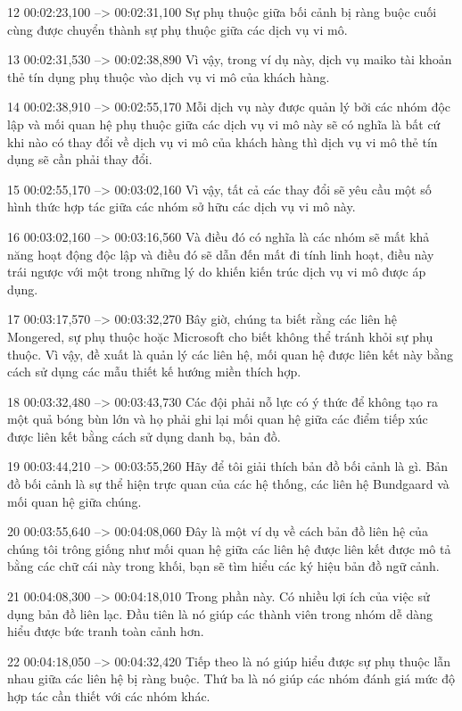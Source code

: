 12
00:02:23,100 --> 00:02:31,100
Sự phụ thuộc giữa bối cảnh bị ràng buộc cuối cùng được chuyển thành sự phụ thuộc giữa các dịch vụ vi mô.

13
00:02:31,530 --> 00:02:38,890
Vì vậy, trong ví dụ này, dịch vụ maiko tài khoản thẻ tín dụng phụ thuộc vào dịch vụ vi mô của khách hàng.

14
00:02:38,910 --> 00:02:55,170
Mỗi dịch vụ này được quản lý bởi các nhóm độc lập và mối quan hệ phụ thuộc giữa các dịch vụ vi mô này sẽ có nghĩa là bất cứ khi nào có thay đổi về dịch vụ vi mô của khách hàng thì dịch vụ vi mô thẻ tín dụng sẽ cần phải thay đổi.

15
00:02:55,170 --> 00:03:02,160
Vì vậy, tất cả các thay đổi sẽ yêu cầu một số hình thức hợp tác giữa các nhóm sở hữu các dịch vụ vi mô này.

16
00:03:02,160 --> 00:03:16,560
Và điều đó có nghĩa là các nhóm sẽ mất khả năng hoạt động độc lập và điều đó sẽ dẫn đến mất đi tính linh hoạt, điều này trái ngược với một trong những lý do khiến kiến ​​trúc dịch vụ vi mô được áp dụng.

17
00:03:17,570 --> 00:03:32,270
Bây giờ, chúng ta biết rằng các liên hệ Mongered, sự phụ thuộc hoặc Microsoft cho biết không thể tránh khỏi sự phụ thuộc.  Vì vậy, đề xuất là quản lý các liên hệ, mối quan hệ được liên kết này bằng cách sử dụng các mẫu thiết kế hướng miền thích hợp.

18
00:03:32,480 --> 00:03:43,730
Các đội phải nỗ lực có ý thức để không tạo ra một quả bóng bùn lớn và họ phải ghi lại mối quan hệ giữa các điểm tiếp xúc được liên kết bằng cách sử dụng danh bạ, bản đồ.

19
00:03:44,210 --> 00:03:55,260
Hãy để tôi giải thích bản đồ bối cảnh là gì.  Bản đồ bối cảnh là sự thể hiện trực quan của các hệ thống, các liên hệ Bundgaard và mối quan hệ giữa chúng.

20
00:03:55,640 --> 00:04:08,060
Đây là một ví dụ về cách bản đồ liên hệ của chúng tôi trông giống như mối quan hệ giữa các liên hệ được liên kết được mô tả bằng các chữ cái này trong khối, bạn sẽ tìm hiểu các ký hiệu bản đồ ngữ cảnh.

21
00:04:08,300 --> 00:04:18,010
Trong phần này.  Có nhiều lợi ích của việc sử dụng bản đồ liên lạc.  Đầu tiên là nó giúp các thành viên trong nhóm dễ dàng hiểu được bức tranh toàn cảnh hơn.

22
00:04:18,050 --> 00:04:32,420
Tiếp theo là nó giúp hiểu được sự phụ thuộc lẫn nhau giữa các liên hệ bị ràng buộc.  Thứ ba là nó giúp các nhóm đánh giá mức độ hợp tác cần thiết với các nhóm khác.

